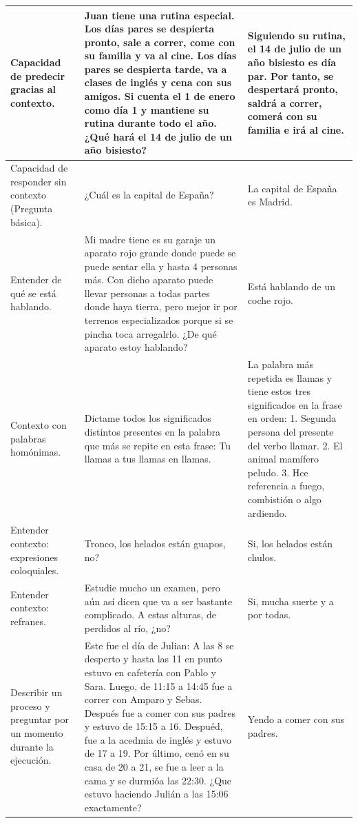 \begin{table}[htbp]
\begin{tabularx}{\textwidth}{|X|X|X|}
    \hline
    Capacidad de predecir gracias al contexto. & Juan tiene una rutina especial. Los días pares se despierta pronto, sale a correr, come con su familia y va al cine. Los días pares se despierta tarde, va a clases de inglés y cena con sus amigos. Si cuenta el 1 de enero como día 1 y mantiene su rutina durante todo el año. ¿Qué hará el 14 de julio de un año bisiesto? & Siguiendo su rutina, el 14 de julio de un año bisiesto es día par. Por tanto, se despertará pronto, saldrá a correr, comerá con su familia e irá al cine. \\
    \hline
    Capacidad de responder sin contexto (Pregunta básica). & ¿Cuál es la capital de España? & La capital de España es Madrid. \\
    \hline
    Entender de qué se está hablando. & Mi madre tiene es su garaje un aparato rojo grande donde puede se puede sentar ella y hasta 4 personas más. Con dicho aparato puede llevar personas a todas partes donde haya tierra, pero mejor ir por terrenos especializados porque si se pincha toca arregalrlo. ¿De qué aparato estoy hablando? & Está hablando de un coche rojo. \\
    \hline
    Contexto con palabras homónimas. & Dictame todos los significados distintos presentes en la palabra que más se repite en esta frase: Tu llamas a tus llamas en llamas. & La palabra más repetida es llamas y tiene estos tres significados en la frase en orden: 1. Segunda persona del presente del verbo llamar. 2. El animal mamífero peludo. 3. Hce referencia a fuego, combistión o algo ardiendo. \\
    \hline
    Entender contexto: expresiones coloquiales. & Tronco, los helados están guapos, no? & Si, los helados están chulos. \\
    \hline
    Entender contexto: refranes. & Estudie mucho un examen, pero aún así dicen que va a ser bastante complicado. A estas alturas, de perdidos al río, ¿no? & Si, mucha suerte y a por todas. \\
    \hline
    Describir un proceso y preguntar por un momento durante la ejecución. & Este fue el día de Julian: A las 8 se desperto y hasta las 11 en punto estuvo en cafetería con Pablo y Sara. Luego, de 11:15 a 14:45 fue a correr con Amparo y Sebas. Después fue a comer con sus padres y estuvo de 15:15 a 16. Despuéd, fue a la acedmia de inglés y estuvo de 17 a 19. Por último, cenó en su casa de 20 a 21, se fue a leer a la cama y se durmióa las 22:30. ¿Que estuvo haciendo Julián a las 15:06 exactamente? & Yendo a comer con sus padres. \\

\end{tabularx}
\end{table}
